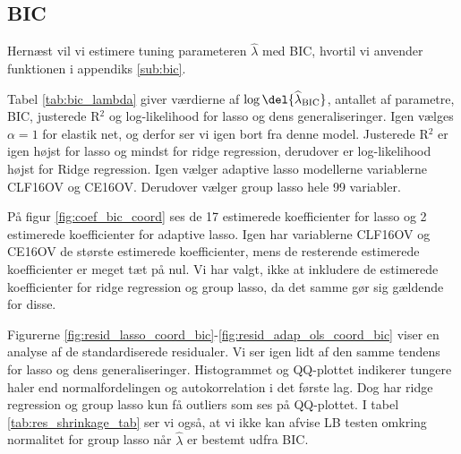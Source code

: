 \subsection{BIC}
Hernæst vil vi estimere tuning parameteren \(\widehat{\lambda}\) med BIC, hvortil vi anvender funktionen i appendiks \ref{sub:bic}.

Tabel \ref{tab:bic_lambda} giver værdierne af $\log \del{ \widehat{\lambda}_\text{BIC}}$, antallet af parametre, BIC, justerede R$^2$ og log-likelihood for lasso og dens generaliseringer. 
Igen vælges \(\alpha = 1\) for elastik net, og derfor ser vi igen bort fra denne model.
Justerede R$^2$ er igen højst for  lasso og mindst for ridge regression, derudover er log-likelihood højst for Ridge regression. 
Igen vælger adaptive lasso modellerne variablerne \textcolor{blue3}{CLF16OV} og \textcolor{blue3}{CE16OV}.
Derudover vælger group lasso hele 99 variabler. 



På figur \ref{fig:coef_bic_coord} ses de 17 estimerede koefficienter for lasso og 2 estimerede koefficienter for adaptive lasso.
Igen har variablerne \textcolor{blue3}{CLF16OV} og \textcolor{blue3}{CE16OV} de største estimerede koefficienter, mens de resterende estimerede koefficienter er meget tæt på nul. 
Vi har valgt, ikke at inkludere de estimerede koefficienter for ridge regression og group lasso, da det samme gør sig gældende for disse.


Figurerne \ref{fig:resid_lasso_coord_bic}-\ref{fig:resid_adap_ols_coord_bic} viser en analyse af de standardiserede residualer.
Vi ser igen lidt af den samme tendens for lasso og dens generaliseringer. 
Histogrammet og QQ-plottet indikerer tungere haler end normalfordelingen og autokorrelation i det første lag. 
Dog har ridge regression og group lasso kun få outliers som ses på QQ-plottet. 
I tabel \ref{tab:res_shrinkage_tab} ser vi også, at vi ikke kan afvise LB testen omkring normalitet for group lasso når $\widehat{\lambda}$ er bestemt udfra BIC. 

\newpage
